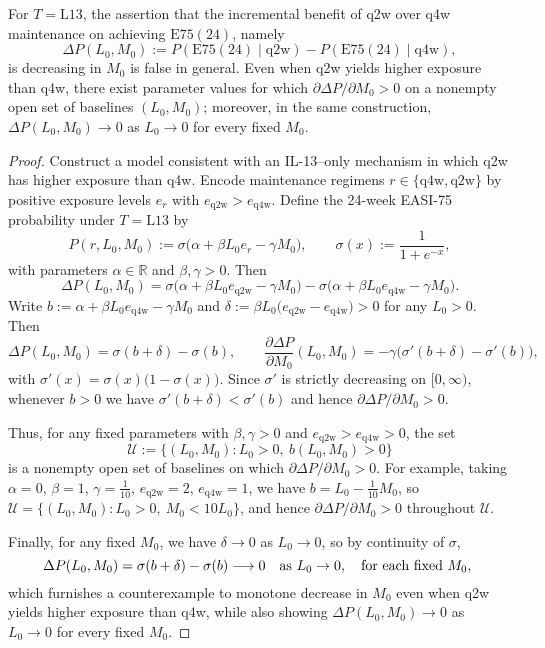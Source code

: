 ﻿\begin{proposition}\label{prop-nonmonotone-m0}
For $T=\mathrm{L13}$, the assertion that the incremental benefit of q2w over q4w maintenance on achieving $\mathrm{E75}(24)$, namely
\[
\Delta P(L_0,M_0) := P(\mathrm{E75}(24)\mid \text{q2w}) - P(\mathrm{E75}(24)\mid \text{q4w}),
\]
is decreasing in $M_0$ is false in general. Even when q2w yields higher exposure than q4w, there exist parameter values for which $\partial\Delta P/\partial M_0>0$ on a nonempty open set of baselines $(L_0,M_0)$; moreover, in the same construction, $\Delta P(L_0,M_0)\to 0$ as $L_0\to 0$ for every fixed $M_0$.
\end{proposition}

\begin{proof}
Construct a model consistent with an IL-13--only mechanism in which q2w has higher exposure than q4w. Encode maintenance regimens $r\in\{\text{q4w},\text{q2w}\}$ by positive exposure levels $e_r$ with $e_{\text{q2w}}>e_{\text{q4w}}$. Define the 24-week EASI-75 probability under $T=\mathrm{L13}$ by
\[
P(r,L_0,M_0) := \sigma\big(\alpha + \beta L_0 e_r - \gamma M_0\big), \qquad \sigma(x) := \frac{1}{1+e^{-x}},
\]
with parameters $\alpha\in\mathbb{R}$ and $\beta,\gamma>0$. Then
\[
\Delta P(L_0,M_0)=\sigma\big(\alpha+\beta L_0 e_{\text{q2w}}-\gamma M_0\big)-\sigma\big(\alpha+\beta L_0 e_{\text{q4w}}-\gamma M_0\big).
\]
Write $b:=\alpha+\beta L_0 e_{\text{q4w}}-\gamma M_0$ and $\delta:=\beta L_0\big(e_{\text{q2w}}-e_{\text{q4w}}\big)>0$ for any $L_0>0$. Then
\[
\Delta P(L_0,M_0)=\sigma(b+\delta)-\sigma(b), \qquad \frac{\partial\Delta P}{\partial M_0}(L_0,M_0)=-\gamma\big(\sigma'(b+\delta)-\sigma'(b)\big),
\]
with $\sigma'(x)=\sigma(x)\big(1-\sigma(x)\big)$. Since $\sigma'$ is strictly decreasing on $[0,\infty)$, whenever $b>0$ we have $\sigma'(b+\delta)<\sigma'(b)$ and hence $\partial\Delta P/\partial M_0>0$.

Thus, for any fixed parameters with $\beta,\gamma>0$ and $e_{\text{q2w}}>e_{\text{q4w}}>0$, the set
\[
\mathcal{U}:=\{(L_0,M_0): L_0>0,\ b(L_0,M_0)>0\}
\]
is a nonempty open set of baselines on which $\partial\Delta P/\partial M_0>0$. For example, taking $\alpha=0$, $\beta=1$, $\gamma=\tfrac{1}{10}$, $e_{\text{q2w}}=2$, $e_{\text{q4w}}=1$, we have $b=L_0-\tfrac{1}{10}M_0$, so $\mathcal{U}=\{(L_0,M_0): L_0>0,\ M_0<10L_0\}$, and hence $\partial\Delta P/\partial M_0>0$ throughout $\mathcal{U}$.

Finally, for any fixed $M_0$, we have $\delta\to 0$ as $L_0\to 0$, so by continuity of $\sigma$,
\[
\Delta P(L_0,M_0)=\sigma(b+\delta)-\sigma(b)\longrightarrow 0 \quad \text{as } L_0\to 0,\quad \text{for each fixed } M_0,\, \qedhere
\]
which furnishes a counterexample to monotone decrease in $M_0$ even when q2w yields higher exposure than q4w, while also showing $\Delta P(L_0,M_0)\to 0$ as $L_0\to 0$ for every fixed $M_0$.
\end{proof}

